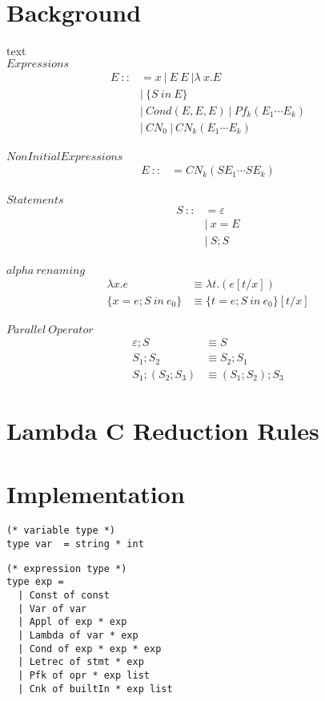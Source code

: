 \documentclass[preprint]{sigplanconf}
\begin{document}
\section{Background}
text 
\\
$Expressions$
\begin{align}
E\ ::&= x\ |\ E\ E\ | \lambda\ x.E \\
&|\ \lbrace S\ in\ E \rbrace \\
&|\ Cond(E,E,E)\ |\ Pf_{k}(E_{1}\cdots E_{k}) \\
&|\ CN_{0}\ |\ CN_{k}(E_{1}\cdots E_{k}) 
\end{align}
\\
$Non Initial Expressions$
\begin{align}
E\ ::&= CN_{k}(SE_{1}\cdots SE_{k}) 
\end{align}
\\
$Statements$
\begin{align}
S\ ::&= \varepsilon\\
&|\ x = E\\
&|\ S;S 
\end{align}
\\
$alpha\ renaming$ 
\begin{align} 
\lambda x.e &\equiv \lambda t.(e[t/x]) \\
\lbrace x=e ; S\ in\ e_{0} \rbrace &\equiv \lbrace t = e; S\ in\ e_{0}  \rbrace [t/x]
\end{align}
\\
$Parallel\ Operator$
\begin{align}
\varepsilon ; S &\equiv S \\
S_{1} ; S_{2} &\equiv S_{2} ; S_{1}\\
S_{1} ; (S_{2} ; S_{3}) &\equiv (S_{1} ; S_{2}) ; S_{3}
\end{align}

\section{Lambda C Reduction Rules}

\section{Implementation}

\begin{verbatim}
(* variable type *)
type var  = string * int
\end{verbatim}

\begin{verbatim}
(* expression type *)
type exp =
  | Const of const
  | Var of var
  | Appl of exp * exp
  | Lambda of var * exp
  | Cond of exp * exp * exp
  | Letrec of stmt * exp
  | Pfk of opr * exp list
  | Cnk of builtIn * exp list 
\end{verbatim}
\end{document}
